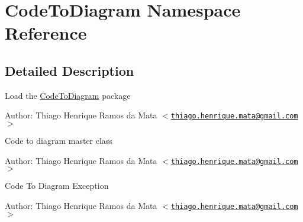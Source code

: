 \hypertarget{namespace_code_to_diagram}{
\section{CodeToDiagram Namespace Reference}
\label{namespace_code_to_diagram}
}


\subsection{Detailed Description}
Load the \hyperlink{namespace_code_to_diagram}{CodeToDiagram} package \begin{Desc}
\item[Author:]Thiago Henrique Ramos da Mata $<$\href{mailto:thiago.henrique.mata@gmail.com}{\tt thiago.henrique.mata@gmail.com}$>$\end{Desc}
Code to diagram master class

\begin{Desc}
\item[Author:]Thiago Henrique Ramos da Mata $<$\href{mailto:thiago.henrique.mata@gmail.com}{\tt thiago.henrique.mata@gmail.com}$>$\end{Desc}
Code To Diagram Exception

\begin{Desc}
\item[Author:]Thiago Henrique Ramos da Mata $<$\href{mailto:thiago.henrique.mata@gmail.com}{\tt thiago.henrique.mata@gmail.com}$>$ \end{Desc}


